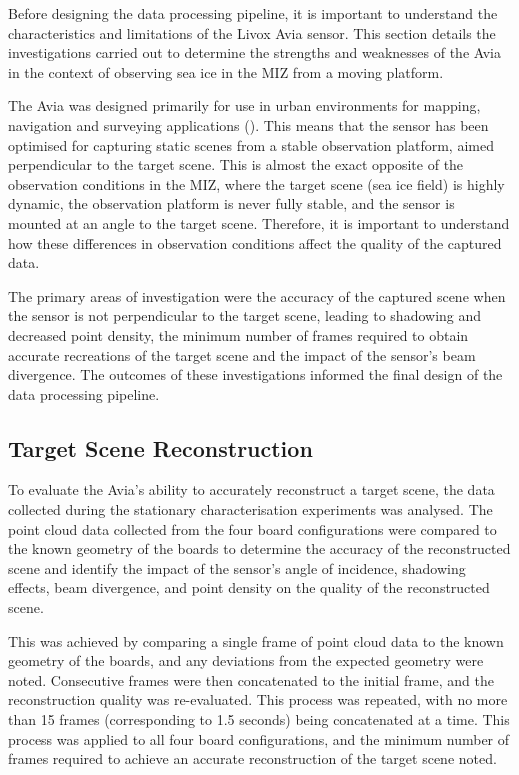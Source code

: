 Before designing the data processing pipeline, it is important to understand the characteristics and limitations of the Livox Avia sensor. This section details the investigations carried out to determine the strengths and weaknesses of the Avia in the context of observing sea ice in the \ac{MIZ} from a moving platform.

The Avia was designed primarily for use in urban environments for mapping, navigation and surveying applications (\cite{AviaLiDARSensor}). This means that the sensor has been optimised for capturing static scenes from a stable observation platform, aimed perpendicular to the target scene. This is almost the exact opposite of the observation conditions in the \ac{MIZ}, where the target scene (sea ice field) is highly dynamic, the observation platform is never fully stable, and the sensor is mounted at an angle to the target scene. Therefore, it is important to understand how these differences in observation conditions affect the quality of the captured data.

The primary areas of investigation were the accuracy of the captured scene when the sensor is not perpendicular to the target scene, leading to shadowing and decreased point density, the minimum number of frames required to obtain accurate recreations of the target scene and the impact of the sensor's beam divergence. The outcomes of these investigations informed the final design of the data processing pipeline.

\subsection{Target Scene Reconstruction}
\label{subsec:ch5.section2.subsec1}

To evaluate the Avia's ability to accurately reconstruct a target scene, the data collected during the stationary characterisation experiments was analysed. The point cloud data collected from the four board configurations were compared to the known geometry of the boards to determine the accuracy of the reconstructed scene and identify the impact of the sensor's angle of incidence, shadowing effects, beam divergence, and point density on the quality of the reconstructed scene.

This was achieved by comparing a single frame of point cloud data to the known geometry of the boards, and any deviations from the expected geometry were noted. Consecutive frames were then concatenated to the initial frame, and the reconstruction quality was re-evaluated. This process was repeated, with no more than 15 frames (corresponding to 1.5 seconds) being concatenated at a time. This process was applied to all four board configurations, and the minimum number of frames required to achieve an accurate reconstruction of the target scene noted.

